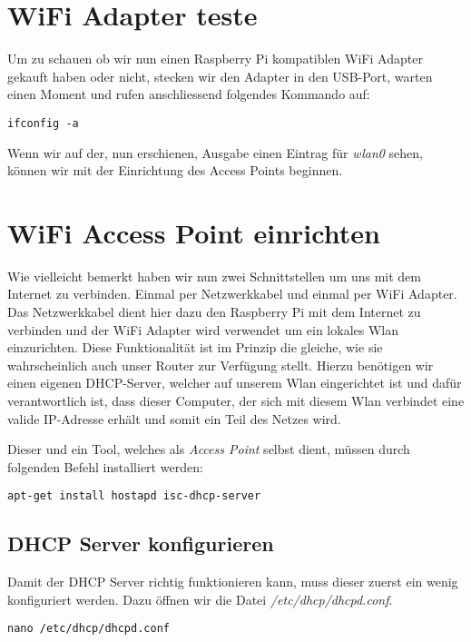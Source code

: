 \section{WiFi Adapter teste}
Um zu schauen ob wir nun einen Raspberry Pi kompatiblen WiFi Adapter gekauft haben oder nicht, stecken wir den Adapter in den USB-Port, warten einen Moment und rufen anschliessend folgendes Kommando auf:

\begin{lstlisting}
ifconfig -a
\end{lstlisting}

Wenn wir auf der, nun erschienen, Ausgabe einen Eintrag für \textit{wlan0} sehen, können wir mit der Einrichtung des Access Points beginnen.

\section{WiFi Access Point einrichten}
Wie vielleicht bemerkt haben wir nun zwei Schnittstellen um uns mit dem Internet zu verbinden. Einmal per Netzwerkkabel und einmal per WiFi Adapter.
Das Netzwerkkabel dient hier dazu den Raspberry Pi mit dem Internet zu verbinden und der WiFi Adapter wird verwendet um ein lokales Wlan einzurichten. Diese Funktionalität ist im Prinzip die gleiche, wie sie wahrscheinlich auch unser Router zur Verfügung stellt. 
Hierzu benötigen wir einen eigenen DHCP-Server, welcher auf unserem Wlan eingerichtet ist und dafür verantwortlich ist, dass dieser Computer, der sich mit diesem Wlan verbindet eine valide IP-Adresse erhält und somit ein Teil des Netzes wird.

Dieser und ein Tool, welches als \textit{Access Point} selbst dient, müssen durch folgenden Befehl installiert werden:

\begin{lstlisting}
apt-get install hostapd isc-dhcp-server
\end{lstlisting}

\subsection{DHCP Server konfigurieren}
Damit der DHCP Server richtig funktionieren kann, muss dieser zuerst ein wenig konfiguriert werden.
Dazu öffnen wir die Datei \textit{/etc/dhcp/dhcpd.conf}.

\begin{lstlisting}
nano /etc/dhcp/dhcpd.conf
\end{lstlisting}

